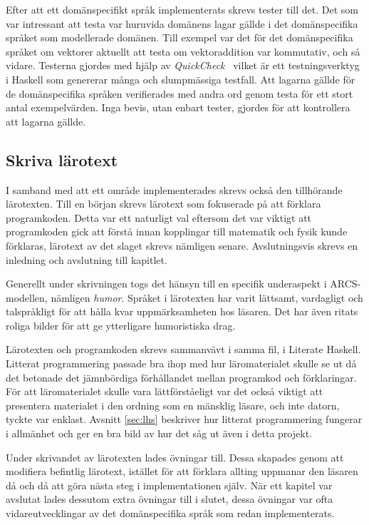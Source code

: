 Efter att ett domänspecifikt språk implementerats skrevs tester till det. Det
som var intressant att testa var huruvida domänens lagar gällde i det domänspecifika språket som modellerade domänen. Till exempel var det för det domänspecifika språket om vektorer aktuellt att testa om vektoraddition var kommutativ, och så vidare.
Testerna gjordes med hjälp av \textit{QuickCheck}~\cite{QC} vilket är ett
testningsverktyg i Haskell som genererar många och slumpmässiga testfall. Att
lagarna gällde för de domänspecifika språken verifierades med andra ord genom
testa för ett stort antal exempelvärden. Inga bevis, utan enbart tester, gjordes för att kontrollera att lagarna gällde.

\subsection{Skriva lärotext}

I samband med att ett område implementerades skrevs också den tillhörande
lärotexten. Till en början skrevs lärotext som fokuserade på att förklara
programkoden. Detta var ett naturligt val eftersom det var viktigt att
programkoden gick att förstå innan kopplingar till matematik och fysik kunde
förklaras, lärotext av det slaget skrevs nämligen senare. Avslutningsvis skrevs
en inledning och avslutning till kapitlet.

Generellt under skrivningen togs det hänsyn till en specifik underaspekt i
ARCS-modellen, nämligen \textit{humor}. Språket i lärotexten har varit lättsamt,
vardagligt och talspråkligt för att hålla kvar uppmärksamheten hos läsaren. Det
har även ritats roliga bilder för att ge ytterligare humoristiska drag.

Lärotexten och programkoden skrevs sammanvävt i samma fil, i Literate
Haskell. Litterat programmering passade bra ihop med
hur läromaterialet skulle se ut då det betonade det jämnbördiga förhållandet
mellan programkod och förklaringar. För att läromaterialet skulle vara
lättförståeligt var det också viktigt att presentera materialet i den ordning
som en mänsklig läsare, och inte datorn, tyckte var enklast. Avsnitt \ref{sec:lhs} beskriver hur litterat programmering fungerar i allmänhet och ger
en bra bild av hur det såg ut även i detta projekt.

Under skrivandet av lärotexten lades övningar till. Dessa skapades genom att
modifiera befintlig lärotext, istället för att förklara allting uppmanar den
läsaren då och då att göra nästa steg i implementationen själv. När ett kapitel
var avslutat lades dessutom extra övningar till i slutet, dessa övningar var
ofta vidareutvecklingar av det domänspecifika språk som redan implementerats.

